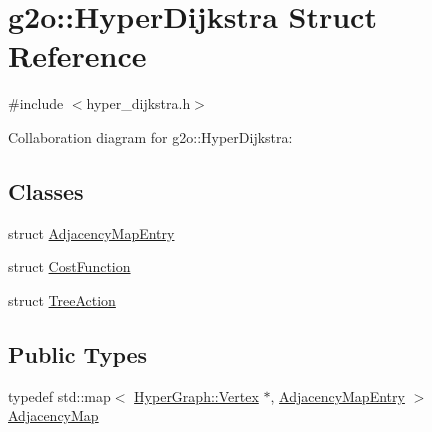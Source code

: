 \hypertarget{structg2o_1_1HyperDijkstra}{}\section{g2o\+:\+:Hyper\+Dijkstra Struct Reference}
\label{structg2o_1_1HyperDijkstra}


{\ttfamily \#include $<$hyper\+\_\+dijkstra.\+h$>$}



Collaboration diagram for g2o\+:\+:Hyper\+Dijkstra\+:
\subsection*{Classes}
\begin{DoxyCompactItemize}
\item 
struct \hyperlink{structg2o_1_1HyperDijkstra_1_1AdjacencyMapEntry}{Adjacency\+Map\+Entry}
\item 
struct \hyperlink{structg2o_1_1HyperDijkstra_1_1CostFunction}{Cost\+Function}
\item 
struct \hyperlink{structg2o_1_1HyperDijkstra_1_1TreeAction}{Tree\+Action}
\end{DoxyCompactItemize}
\subsection*{Public Types}
\begin{DoxyCompactItemize}
\item 
typedef std\+::map$<$ \hyperlink{classg2o_1_1HyperGraph_1_1Vertex}{Hyper\+Graph\+::\+Vertex} $\ast$, \hyperlink{structg2o_1_1HyperDijkstra_1_1AdjacencyMapEntry}{Adjacency\+Map\+Entry} $>$ \hyperlink{structg2o_1_1HyperDijkstra_af12ff8eef95094815a3fa1da0514bda2}{Adjacency\+Map}
\end{DoxyCompactItemize}
